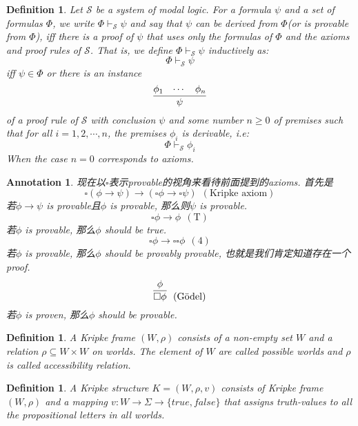 \documentclass{article}
\theoremstyle{plain}
\newtheorem{definition}[theorem]{Definition}
\newtheorem{annotation}[theorem]{Annotation}
\theoremstyle{nonumberplain}
\begin{document}
\begin{definition}
\rm Let $\mathcal{S}$ be a system of modal logic. For a formula $\psi$ and a set of formulas $\Phi$,  we write $\Phi \vdash_\mathcal{S} \psi$ and say that $\psi$ can be derived from $\Phi$(or is provable from $\Phi$), iff there is a proof of $\psi$ that uses only the formulas of $\Phi$ and the axioms and proof rules of $\mathcal{S}$. That is, we define $\Phi \vdash_\mathcal{S} \psi$ inductively as:
$$
\Phi \vdash_\mathcal{S} \psi
$$
iff $\psi \in \Phi$ or there is an instance
$$
\infer{\psi}{\phi_1 &  \cdots & \phi_n}
$$
of a proof rule of $\mathcal{S}$ with conclusion $\psi$ and some number $n \geq 0$ of premises such that for all $i=1,2,\cdots,n$, the premises $\phi_i$ is derivable, i.e:
$$
\Phi \vdash_\mathcal{S} \phi_i
$$
When the case $n=0$ corresponds to axioms. 
\end{definition}

\begin{annotation}
\rm 现在以$\square$表示provable的视角来看待前面提到的axioms. 首先是
$$
\square(\phi \to \psi) \to (\square\phi \to \square\psi)~~ (\text{Kripke axiom})
$$
若$\phi \to \psi$ is provable且$\phi$ is provable, 那么则$\psi$ is provable. 
$$
\square\phi \to \phi ~~(\text{T})
$$
若$\phi$ is provable, 那么$\phi$ should be true.
$$
\square\phi \to \square\square\phi ~~(4)
$$
若$\phi$ is provable, 那么$\phi$ should be provably provable, 也就是我们肯定知道存在一个proof. 
$$
\infer{\square \phi}{\phi} ~~(\text{G\"{o}del}) 
$$
若$\phi$ is proven, 那么$\phi$ should be provable. 
\end{annotation}


\begin{definition}
\rm A Kripke frame $(W,\rho)$ consists of a non-empty set $W$ and a relation $\rho \subseteq W \times W$ on worlds. The element of $W$ are called possible worlds and $\rho$ is called accessibility relation. 
\end{definition}

\begin{definition}
\rm A Kripke structure $K = (W, \rho, v)$ consists of Kripke frame $(W,\rho)$ and a mapping $v : W \to \Sigma \to \{true, false\}$ that assigns truth-values to all the propositional letters in all worlds.
\end{definition}
\end{document}
